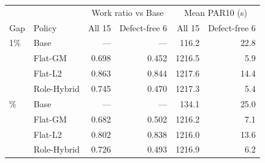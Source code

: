 \begin{tabular}{llrrrr}
\toprule
& & \multicolumn{2}{c}{Work ratio vs Base} & \multicolumn{2}{c}{Mean PAR10 (s)} \\
Gap & Policy & All 15 & Defect-free 6 & All 15 & Defect-free 6 \\
\midrule
1\% & Base & --- & --- & 116.2 & 22.8 \\
 & Flat-GM & 0.698 & 0.452 & 1216.5 & 5.9 \\
 & Flat-L2 & 0.863 & 0.844 & 1217.6 & 14.4 \\
 & Role-Hybrid & 0.745 & 0.470 & 1217.3 & 5.4 \\
\addlinespace
0.1\% & Base & --- & --- & 134.1 & 25.0 \\
 & Flat-GM & 0.682 & 0.502 & 1216.2 & 7.1 \\
 & Flat-L2 & 0.802 & 0.838 & 1216.0 & 13.6 \\
 & Role-Hybrid & 0.726 & 0.493 & 1216.9 & 6.2 \\
\bottomrule
\end{tabular}
